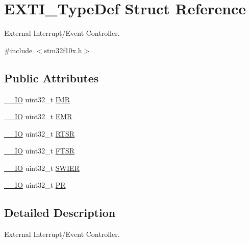 \hypertarget{struct_e_x_t_i___type_def}{\section{E\-X\-T\-I\-\_\-\-Type\-Def Struct Reference}
\label{struct_e_x_t_i___type_def}
}


External Interrupt/\-Event Controller.  




{\ttfamily \#include $<$stm32f10x.\-h$>$}

\subsection*{Public Attributes}
\begin{DoxyCompactItemize}
\item 
\hyperlink{group___c_m_s_i_s__core__definitions_gaec43007d9998a0a0e01faede4133d6be}{\-\_\-\-\_\-\-I\-O} uint32\-\_\-t \hyperlink{struct_e_x_t_i___type_def_a17d061db586d4a5aa646b68495a8e6a4}{I\-M\-R}
\item 
\hyperlink{group___c_m_s_i_s__core__definitions_gaec43007d9998a0a0e01faede4133d6be}{\-\_\-\-\_\-\-I\-O} uint32\-\_\-t \hyperlink{struct_e_x_t_i___type_def_a9c5bff67bf9499933959df7eb91a1bd6}{E\-M\-R}
\item 
\hyperlink{group___c_m_s_i_s__core__definitions_gaec43007d9998a0a0e01faede4133d6be}{\-\_\-\-\_\-\-I\-O} uint32\-\_\-t \hyperlink{struct_e_x_t_i___type_def_ac019d211d8c880b327a1b90a06cc0675}{R\-T\-S\-R}
\item 
\hyperlink{group___c_m_s_i_s__core__definitions_gaec43007d9998a0a0e01faede4133d6be}{\-\_\-\-\_\-\-I\-O} uint32\-\_\-t \hyperlink{struct_e_x_t_i___type_def_aee667dc148250bbf37fdc66dc4a9874d}{F\-T\-S\-R}
\item 
\hyperlink{group___c_m_s_i_s__core__definitions_gaec43007d9998a0a0e01faede4133d6be}{\-\_\-\-\_\-\-I\-O} uint32\-\_\-t \hyperlink{struct_e_x_t_i___type_def_a5c1f538e64ee90918cd158b808f5d4de}{S\-W\-I\-E\-R}
\item 
\hyperlink{group___c_m_s_i_s__core__definitions_gaec43007d9998a0a0e01faede4133d6be}{\-\_\-\-\_\-\-I\-O} uint32\-\_\-t \hyperlink{struct_e_x_t_i___type_def_a133294b87dbe6a01e8d9584338abc39a}{P\-R}
\end{DoxyCompactItemize}


\subsection{Detailed Description}
External Interrupt/\-Event Controller. 

